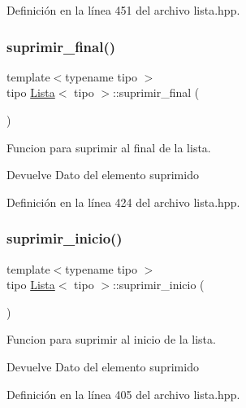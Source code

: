 Definición en la línea 451 del archivo lista.\+hpp.

\mbox{\label{classLista_aa23f3bd8ec8de6a913cc9cd876ef82b6}} 
\subsubsection{\texorpdfstring{suprimir\+\_\+final()}{suprimir\_final()}}
{\footnotesize\ttfamily template$<$typename tipo $>$ \\
tipo \hyperlink{classLista}{Lista}$<$ tipo $>$\+::suprimir\+\_\+final (\begin{DoxyParamCaption}{ }\end{DoxyParamCaption})}



Funcion para suprimir al final de la lista. 

\begin{DoxyReturn}{Devuelve}
Dato del elemento suprimido 
\end{DoxyReturn}


Definición en la línea 424 del archivo lista.\+hpp.

\mbox{\label{classLista_aa945bc96acdaeaefb3b9180f05539142}} 
\subsubsection{\texorpdfstring{suprimir\+\_\+inicio()}{suprimir\_inicio()}}
{\footnotesize\ttfamily template$<$typename tipo $>$ \\
tipo \hyperlink{classLista}{Lista}$<$ tipo $>$\+::suprimir\+\_\+inicio (\begin{DoxyParamCaption}{ }\end{DoxyParamCaption})}



Funcion para suprimir al inicio de la lista. 

\begin{DoxyReturn}{Devuelve}
Dato del elemento suprimido 
\end{DoxyReturn}


Definición en la línea 405 del archivo lista.\+hpp.

\mbox{\label{classLista_ab425ba6e39a83df96a56ef6d58bce951}} 
